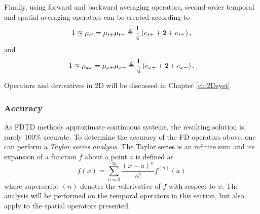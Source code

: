 Finally, using forward and backward averaging operators, second-order temporal and spatial averaging operators can be created according to
\begin{equation}
    1 \approxeq \mu_{tt} = \mu_{t+}\mu_{t-} \triangleq \frac{1}{4}\left(e_{t+}+2+e_{t-}\right),
\end{equation}
and
\begin{equation}
    1 \approxeq \mu_{xx} = \mu_{x+}\mu_{x-} \triangleq \frac{1}{4}\left(e_{x+}+2+e_{x-}\right).
\end{equation}

Operators and derivatives in 2D will be discussed in Chapter \ref{ch:2Dsyst}.


\subsubsection{Accuracy}
As FDTD methods approximate continuous systems, the resulting solution is rarely 100\% accurate. To determine the accuracy of the FD operators above, one can perform a \textit{Taylor series analysis}. The Taylor series is an infinite sum and its expansion of a function $f$ about a point $a$ is defined as
\begin{equation}
    f(x) = \sum_{n=0}^{\infty} \frac{(x-a)^n}{n!}f^{(n)}(a)
\end{equation}
where superscript $(n)$ denotes the $n$\th derivative of $f$ with respect to $x$. The analysis will be performed on the temporal operators in this section, but also apply to the spatial operators presented.

